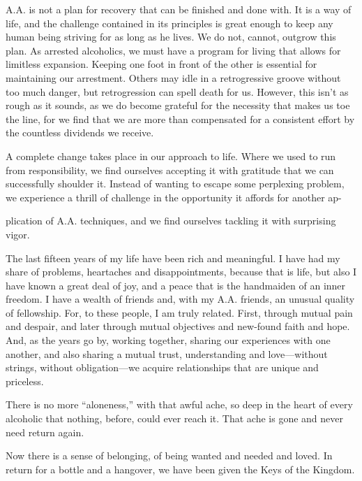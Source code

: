 \begin{biblechapter}
A.A. is not a plan for recovery that can be finished and done with. It is a way of life, and the challenge contained in its principles is great enough to keep any human being striving for as long as he lives. We do not, cannot, outgrow this plan. As arrested alcoholics, we must have a program for living that allows for limitless expansion. Keeping one foot in front of the other is essential for maintaining our arrestment. Others may idle in a retrogressive groove without too much danger, but retrogression can spell death for us. However, this isn’t as rough as it sounds, as we do become grateful for the necessity that makes us toe the line, for we find that we are more than compensated for a consistent effort by the countless dividends we receive.

A complete change takes place in our approach to life. Where we used to run from responsibility, we find ourselves accepting it with gratitude that we can successfully shoulder it. Instead of wanting to escape some perplexing problem, we experience a thrill of challenge in the opportunity it affords for another ap-

plication of A.A. techniques, and we find ourselves tackling it with surprising vigor.

The last fifteen years of my life have been rich and meaningful. I have had my share of problems, heartaches and disappointments, because that is life, but also I have known a great deal of joy, and a peace that is the handmaiden of an inner freedom. I have a wealth of friends and, with my A.A. friends, an unusual quality of fellowship. For, to these people, I am truly related. First, through mutual pain and despair, and later through mutual objectives and new-found faith and hope. And, as the years go by, working together, sharing our experiences with one another, and also sharing a mutual trust, understanding and love—without strings, without obligation—we acquire relationships that are unique and priceless.

There is no more “aloneness,” with that awful ache, so deep in the heart of every alcoholic that nothing, before, could ever reach it. That ache is gone and never need return again.

Now there is a sense of belonging, of being wanted and needed and loved. In return for a bottle and a hangover, we have been given the Keys of the Kingdom.
\end{biblechapter}

